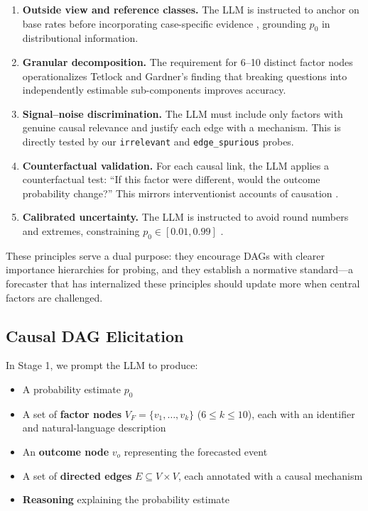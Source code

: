 \documentclass[11pt]{article}
\begin{document}
\begin{enumerate}
    \item \textbf{Outside view and reference classes.} The LLM is instructed to anchor on base rates before incorporating case-specific evidence \cite{kahneman2011thinking}, grounding $p_0$ in distributional information.

    \item \textbf{Granular decomposition.} The requirement for 6--10 distinct factor nodes operationalizes Tetlock and Gardner's finding that breaking questions into independently estimable sub-components improves accuracy.

    \item \textbf{Signal--noise discrimination.} The LLM must include only factors with genuine causal relevance and justify each edge with a mechanism. This is directly tested by our \texttt{irrelevant} and \texttt{edge\_spurious} probes.

    \item \textbf{Counterfactual validation.} For each causal link, the LLM applies a counterfactual test: ``If this factor were different, would the outcome probability change?'' This mirrors interventionist accounts of causation \cite{woodward2005making}.

    \item \textbf{Calibrated uncertainty.} The LLM is instructed to avoid round numbers and extremes, constraining $p_0 \in [0.01, 0.99]$ \cite{baron2014heuristics}.
\end{enumerate}

These principles serve a dual purpose: they encourage DAGs with clearer importance hierarchies for probing, and they establish a normative standard---a forecaster that has internalized these principles should update more when central factors are challenged.

\subsection{Causal DAG Elicitation}
\label{sec:dag}

In Stage 1, we prompt the LLM to produce:
\begin{itemize}
    \item A probability estimate $p_0$
    \item A set of \textbf{factor nodes} $V_F = \{v_1, \ldots, v_k\}$ ($6 \leq k \leq 10$), each with an identifier and natural-language description
    \item An \textbf{outcome node} $v_o$ representing the forecasted event
    \item A set of \textbf{directed edges} $E \subseteq V \times V$, each annotated with a causal mechanism
    \item \textbf{Reasoning} explaining the probability estimate
\end{itemize}
\end{document}
